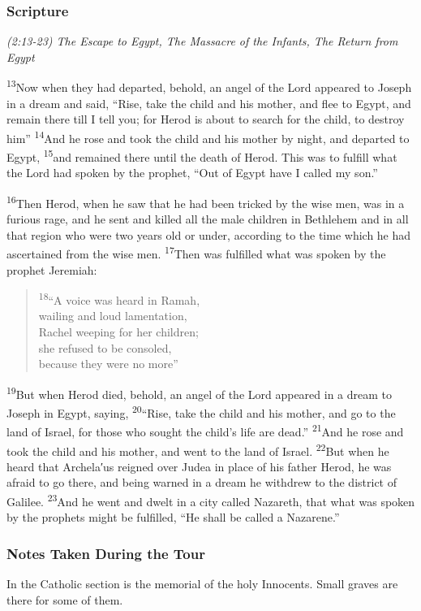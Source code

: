 \documentclass[letterpaper]{report}
\newcommand{\vs}[1]{\textsuperscript{#1}}
\begin{document}
\subsubsection{Scripture}
{\centering
\emph{(2:13-23) The Escape to Egypt,
The Massacre of the Infants,
The Return from Egypt}\\
}
\begin{multicols}{2}
\vs{13}Now when they had departed, behold,
an angel of the Lord appeared to Joseph in a dream and said, ``Rise,
take the child and his mother, and flee to Egypt,
and remain there till I tell you; for Herod is about to search for the child,
to destroy him''
\vs{14}And he rose and took the child and his mother by night,
and departed to Egypt,
\vs{15}and remained there until the death of Herod.
This was to fulfill what the Lord had spoken by the prophet,
``Out of Egypt have I called my son.''

\vs{16}Then Herod, when he saw that he had been tricked by the wise men,
was in a furious rage,
and he sent and killed all the male children in Bethlehem and in all that 
region who were two years old or under,
according to the time which he had ascertained from the wise men.
\vs{17}Then was fulfilled what was spoken by the prophet Jeremiah:

\begin{verse}
\vs{18}``A voice was heard in Ramah,\\
wailing and loud lamentation,\\
Rachel weeping for her children;\\
she refused to be consoled,\\
because they were no more''\\
\end{verse}

\vs{19}But when Herod died, behold,
an angel of the Lord appeared in a dream to Joseph in Egypt, saying,
\vs{20}``Rise, take the child and his mother, and go to the land of Israel,
for those who sought the child’s life are dead.''
\vs{21}And he rose and took the child and his mother,
and went to the land of Israel.
\vs{22}But when he heard that Archela′us reigned over Judea in place of his 
father Herod, he was afraid to go there,
and being warned in a dream he withdrew to the district of Galilee.
\vs{23}And he went and dwelt in a city called Nazareth,
that what was spoken by the prophets might be fulfilled,
``He shall be called a Nazarene.''
\end{multicols}

\subsubsection{Notes Taken During the Tour}
In the Catholic section is the memorial of the holy Innocents.  Small graves are there for some of them.
\end{document}
